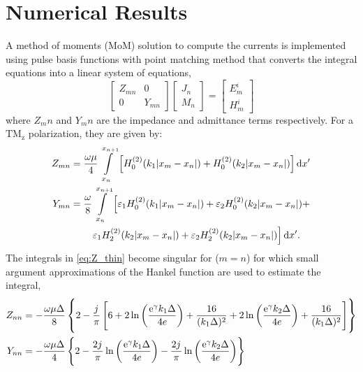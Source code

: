 \section{Numerical Results}
%
A method of moments (MoM) solution to compute the currents is implemented using pulse basis functions with point matching method \cite{Harrington1993} that converts the integral equations into a linear system of equations,
%
\begin{equation}
\begin{bmatrix}
  Z_{mn}   & 0 \\
  0        & Y_{mn}
\end{bmatrix}
\begin{bmatrix}
  J_n \\
  M_n
\end{bmatrix}
=
\begin{bmatrix}
  E_m^i \\
  H_m^i
\end{bmatrix}
\label{eq:MOM}
\end{equation}
%
where $Z_mn$ and $Y_mn$ are the impedance and admittance terms respectively. For a $\mathrm{TM_z}$ polarization, they are given by:
%
\begin{subequations}
  \begin{align}
    Z_{mn} &= \frac{\omega \mu}{4} \int \limits_{x_n}^{x_{n+1}}  \left[ H_0^{(2)}(k_1 |x_m - x_n|) +  H_0^{(2)}(k_2 |x_m - x_n|) \right]\mathop{}\!\mathrm{d}{x'}
    \label{eq:Z_thin_J}\\
    Y_{mn} &= \frac{\omega}{8} \int \limits_{x_n}^{x_{n+1}}  \left[ \varepsilon_1 H_0^{(2)}(k_1 |x_m - x_n|) +  \varepsilon_2 H_0^{(2)}(k_2 |x_m - x_n|) +  \right.\notag\\
    & \qquad \left. \varepsilon_1 H_2^{(2)}(k_2 |x_m - x_n|) + \varepsilon_2 H_2^{(2)}(k_2 |x_m - x_n|) \right]\mathop{}\!\mathrm{d}{x'}.
    \label{eq:Y_M}
  \end{align}
  \label{eq:Z_thin}%
\end{subequations}%
%
The integrals in \eqref{eq:Z_thin} become singular for ($m = n$) for which small argument approximations of the Hankel function are used to estimate the integral,
%
\begin{subequations}
  \begin{align}
    Z_{nn} &=  -\frac{\omega \mu \Delta}{8} \left\{
    2 -\frac{{j}\mkern1mu}{\pi} \left[ 6 + 2 \ln \left(\frac{\mathrm{e}^{\gamma} k_1 \Delta}{4 e}\right) + \frac{16}{(k_1 \Delta)^2} + 2 \ln \left(\frac{ \mathrm{e}^{\gamma} k_2 \Delta}{4 e}\right) + \frac{16}{(k_1 \Delta)^2} \right]   \right\}
    \label{eq:Z_thin_self}\\
    Y_{nn} &= -\frac{\omega \mu \Delta}{4} \left\{ 2 -\frac{2 {j}\mkern1mu}{\pi}\ln \left(\frac{\mathrm{e}^{\gamma} k_1 \Delta}{4 e}\right) -
    \frac{2 {j}\mkern1mu}{\pi}\ln \left(\frac{\mathrm{e}^{\gamma} k_2 \Delta}{4 e}
    \right)
    \right\}
    \label{eq:Y_self}
  \end{align}
  \label{eq:Z_thinself}%
\end{subequations}%
%

